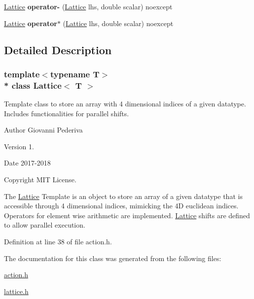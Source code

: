 \begin{DoxyCompactItemize}
\item 
\hyperlink{classLattice}{Lattice} {\bfseries operator-\/} (\hyperlink{classLattice}{Lattice} lhs, double scalar) noexcept\hypertarget{classLattice_a639c0b3a16e4da87bfcf35fbdc19cb77}{}\label{classLattice_a639c0b3a16e4da87bfcf35fbdc19cb77}

\item 
\hyperlink{classLattice}{Lattice} {\bfseries operator$\ast$} (\hyperlink{classLattice}{Lattice} lhs, double scalar) noexcept\hypertarget{classLattice_a718b8da2ada193995a48d9f6b2cebf5e}{}\label{classLattice_a718b8da2ada193995a48d9f6b2cebf5e}

\end{DoxyCompactItemize}


\subsection{Detailed Description}
\subsubsection*{template$<$typename T$>$\\*
class Lattice$<$ T $>$}

Template class to store an array with 4 dimensional indices of a given datatype. Includes functionalities for parallel shifts. 

\begin{DoxyAuthor}{Author}
Giovanni Pederiva 
\end{DoxyAuthor}
\begin{DoxyVersion}{Version}
1. 
\end{DoxyVersion}
\begin{DoxyDate}{Date}
2017-\/2018 
\end{DoxyDate}
\begin{DoxyCopyright}{Copyright}
M\+IT License.
\end{DoxyCopyright}
The \hyperlink{classLattice}{Lattice} Template is an object to store an array of a given datatype that is accessible through 4 dimensional indices, mimicking the 4D euclidean indices. Operators for element wise arithmetic are implemented. \hyperlink{classLattice}{Lattice} shifts are defined to allow parallel execution. 

Definition at line 38 of file action.\+h.



The documentation for this class was generated from the following files\+:\begin{DoxyCompactItemize}
\item 
\hyperlink{action_8h}{action.\+h}\item 
\hyperlink{lattice_8h}{lattice.\+h}\end{DoxyCompactItemize}
